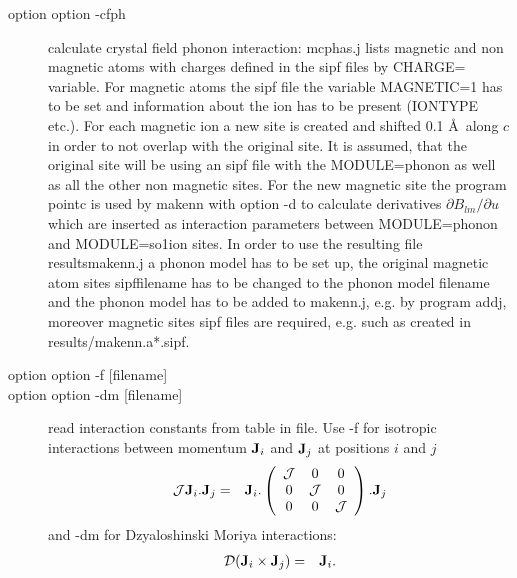 \begin{description}
\begin{description}
\item[option {\prg  option -cfph }]
              calculate crystal field phonon interaction: {\prg mcphas.j} lists 
              magnetic and non magnetic atoms with charges defined in the 
              sipf files by {\prg CHARGE= variable}. For magnetic atoms the sipf 
              file the variable {\prg MAGNETIC=1} has to be set and information 
              about the ion has to be present ({\prg IONTYPE} etc.). 
              For each magnetic ion a new site is created and shifted
              0.1 \AA \ along $c$ in order to not overlap with the original site.
              It is assumed, that the original site will be using an sipf
              file with the {\prg MODULE=phonon} as well as all the other
              non magnetic sites. For the new magnetic site the program
              {\prg pointc} is used by {\prg makenn} with option -d to calculate derivatives
              $\partial B_{lm}/\partial u$ which are inserted as interaction 
              parameters between {\prg MODULE=phonon} and {\prg MODULE=so1ion} sites.
              In order to use the resulting file {\prg results\/makenn.j} a phonon
              model has to be set up, the original magnetic atom sites 
              {\prg sipffilename} has to be changed to the phonon model filename 
              and the phonon model has to be added to {\prg makenn.j},  e.g. by
              program {\prg addj}, moreover magnetic sites sipf files are required, 
              e.g. such as created in {\prg results\//makenn.a*.sipf}. 
\item[option {\prg  option -f [filename]}]
\item[option {\prg  option -dm [filename]}]
              read interaction constants from table in file. 
              Use -f for isotropic interactions between momentum $\mathbf J_i$ and $\mathbf J_j$
              at positions $i$ and $j$
\begin{eqnarray}
              \mathcal J \mathbf J_i . \mathbf J_j &  = & \mathbf J_i.
\left( \begin{array}{ccc}
 \mathcal J &  0 & 0\\
0 &   \mathcal J & 0 \\
0 &  0 &  \mathcal J \\
\end{array}
\right) .\mathbf J_j
\end{eqnarray}
              and -dm for Dzyaloshinski Moriya interactions:
\begin{eqnarray}
              \mathcal D (\mbf J_i \times \mbf J_j )&  = & \mbf   J_i.

\end{eqnarray}
\end{description}
\end{description}
